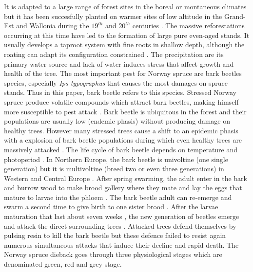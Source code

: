 \documentclass[3p,procedia]{elsarticle}
\begin{document}
It is adapted to a large range of forest sites in the boreal or montaneous climates but it has been succesfully planted on warmer sites of low altitude in the Grand-Est and Wallonia during the $19^{th}$ and $20^{th}$ centuries \citep{Noirfalise_1975,guinier_trois_1959}.
The massive reforestations occurring at this time have led to the formation of large pure even-aged stands.
It usually develops a taproot system with fine roots in shallow depth, although the roating can adapt its configuration constrained \citep{puhe_roots_2003,kostler_1968,}.   
The precipitation are its primary water source \citep{tjoelker_outline_2007} and lack of water induces stress that affect growth and health of the tree. 
The most important pest for Norway spruce are bark beetles species, especially \textit{Ips typographus} that causes the most damages on spruce stands.
Thus in this paper, bark beetle refers to this species.
Stressed Norway spruce produce volatile compounds which attract bark beetles, making himself more susceptible to pest attack \citep{netherer_waterlimiting_2015,netherer_interactions_2021}.
Bark beetle is ubiquitous in the forest and their populations are usually low (endemic phasis) without producing damage on healthy trees. 
However many stressed trees  cause a shift to an epidemic phasis with a explosion of bark beetle populations during which even healthy trees are massively attacked \citep{kautz_individual_2014}.
The life cycle of bark beetle depends on temperature and photoperiod \citep{annila_influence_1969, baier_phenipscomprehensive_2007}.
In Northern Europe, the bark beetle is univoltine (one single generation) but it is multivoltine (breed two or even three generations) in Western and Central Europe \citep{annila_influence_1969}.
After spring swarming, the adult enter in the bark and burrow wood to make brood gallery where they mate and lay the eggs that mature to larvae into the phloem \citep{hlasny_bark_2021}.
The bark beetle adult can re-emerge and swarm a second time to give birth to one sister brood \citep{zolubas_1995}.
After the larvae maturation that last about seven weeks \citep{baier_phenipscomprehensive_2007}, the new generation of beetles emerge and attack the direct surrounding trees \citep{zolubas_1995}.
Attacked trees defend themselves by pulsing resin to kill the bark beetle but these defence failed to resist again numerous simultaneous attacks that induce their decline and rapid death.
The Norway spruce dieback goes through three physiological stages which are denominated green, red and grey stage.
\end{document}
